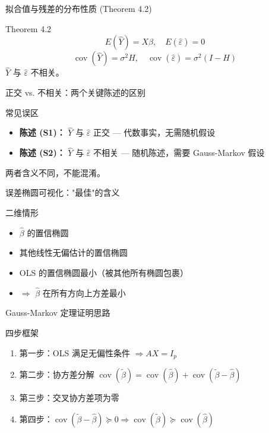 \documentclass[]{beamer}
\DeclareMathOperator{\cov}{cov}
\begin{document}
\begin{frame}{拟合值与残差的分布性质 (Theorem 4.2)}
\begin{block}{Theorem 4.2}
\[
E(\hat{Y}) = X\beta, \quad E(\hat{\varepsilon}) = 0
\]
\[
\cov(\hat{Y}) = \sigma^2 H, \quad \cov(\hat{\varepsilon}) = \sigma^2(I-H)
\]
$\hat{Y}$ 与 $\hat{\varepsilon}$ 不相关。
\end{block}
\end{frame}

\begin{frame}{正交 vs. 不相关：两个关键陈述的区别}
\begin{alertblock}{常见误区}
\begin{itemize}
  \item \textbf{陈述 (S1)：} $\hat{Y}$ 与 $\hat{\varepsilon}$ 正交 --- 代数事实，无需随机假设
  \item \textbf{陈述 (S2)：} $\hat{Y}$ 与 $\hat{\varepsilon}$ 不相关 --- 随机陈述，需要 Gauss-Markov 假设
\end{itemize}
两者含义不同，不能混淆。
\end{alertblock}
\end{frame}

\begin{frame}{误差椭圆可视化："最佳"的含义}
\begin{block}{二维情形}
\begin{itemize}
  \item $\hat{\beta}$ 的置信椭圆
  \item 其他线性无偏估计的置信椭圆
  \item OLS 的置信椭圆最小（被其他所有椭圆包裹）
  \item $\Rightarrow$ $\hat{\beta}$ 在所有方向上方差最小
\end{itemize}
\end{block}
\end{frame}

\begin{frame}{Gauss-Markov 定理证明思路}
\begin{block}{四步框架}
\begin{enumerate}
  \item 第一步：OLS 满足无偏性条件 $\Rightarrow AX = I_p$
  \item 第二步：协方差分解 $\cov(\tilde{\beta}) = \cov(\hat{\beta}) + \cov(\tilde{\beta} - \hat{\beta})$
  \item 第三步：交叉协方差项为零
  \item 第四步：$\cov(\tilde{\beta} - \hat{\beta}) \succeq 0 \Rightarrow \cov(\tilde{\beta}) \succeq \cov(\hat{\beta})$
\end{enumerate}
\end{block}
\end{frame}
\end{document}

